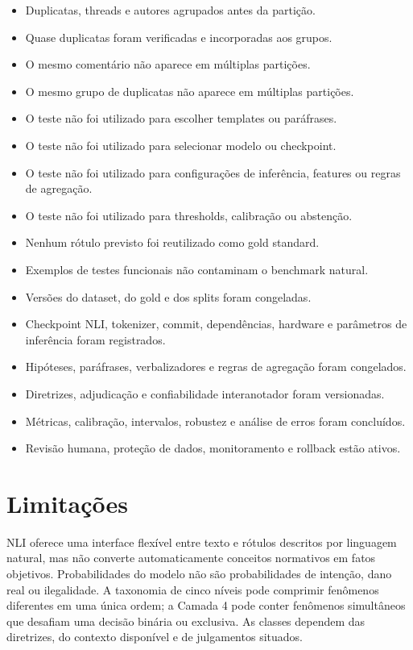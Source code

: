 \begin{itemize}
\item[\checkempty] Duplicatas, threads e autores agrupados antes da partição.
\item[\checkempty] Quase duplicatas foram verificadas e incorporadas aos grupos.
\item[\checkempty] O mesmo comentário não aparece em múltiplas partições.
\item[\checkempty] O mesmo grupo de duplicatas não aparece em múltiplas partições.
\item[\checkempty] O teste não foi utilizado para escolher templates ou paráfrases.
\item[\checkempty] O teste não foi utilizado para selecionar modelo ou checkpoint.
\item[\checkempty] O teste não foi utilizado para configurações de inferência, features ou regras de agregação.
\item[\checkempty] O teste não foi utilizado para thresholds, calibração ou abstenção.
\item[\checkempty] Nenhum rótulo previsto foi reutilizado como gold standard.
\item[\checkempty] Exemplos de testes funcionais não contaminam o benchmark natural.
\item[\checkempty] Versões do dataset, do gold e dos splits foram congeladas.
\item[\checkempty] Checkpoint NLI, tokenizer, commit, dependências, hardware e parâmetros de inferência foram registrados.
\item[\checkempty] Hipóteses, paráfrases, verbalizadores e regras de agregação foram congelados.
\item[\checkempty] Diretrizes, adjudicação e confiabilidade interanotador foram versionadas.
\item[\checkempty] Métricas, calibração, intervalos, robustez e análise de erros foram concluídos.
\item[\checkempty] Revisão humana, proteção de dados, monitoramento e rollback estão ativos.
\end{itemize}

\section{Limitações}

NLI oferece uma interface flexível entre texto e rótulos descritos por linguagem natural, mas não converte automaticamente conceitos normativos em fatos objetivos. Probabilidades do modelo não são probabilidades de intenção, dano real ou ilegalidade. A taxonomia de cinco níveis pode comprimir fenômenos diferentes em uma única ordem; a Camada 4 pode conter fenômenos simultâneos que desafiam uma decisão binária ou exclusiva. As classes dependem das diretrizes, do contexto disponível e de julgamentos situados.

